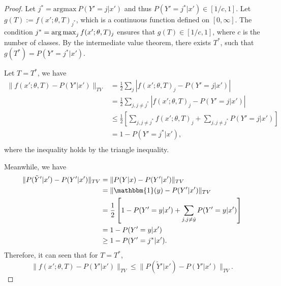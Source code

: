 \begin{proof}


Let $j^* = \text{argmax}~P(Y'=j|x')$ and thus $P(Y'=j^*|x') \in [1/c,1]$. Let $g(T) := f(x'; \theta, T)_{j^*}$, which is a continuous function defined on $[0, \infty]$. The condition $j^* = \operatorname*{arg\,max}_j f(x'; \theta, T)_j$ ensures that $g(T) \in [1/c, 1]$, where $c$ is the number of classes. By the intermediate value theorem, there exists $T^*$, such that $g(T^*) = P(Y'=j^*|x')$.

Let $T = T^*$, we have
$$
\begin{aligned}
\|f(x'; \theta, T) - P(Y' | x')\|_{TV} 
& = \frac{1}{2} \sum_j \left|f(x'; \theta, T)_j - P(Y' =j | x')\right|\\
& = \frac{1}{2} \sum_{j, j\ne j^*} \left|f(x'; \theta, T)_j - P(Y' = j| x')\right|\\
& \le \frac{1}{2} \left[ \sum_{j, j\ne j^*} f(x'; \theta, T)_j + \sum_{j, j\ne j^*} P(Y' = j| x') \right]\\
& = 1 - P(Y'=j^*|x'),\\
\end{aligned}
$$
where the inequality holds by the triangle inequality.


Meanwhile, we have
$$
\begin{aligned}
\|P(\tilde{Y}' | x') - P(Y' | x')\|_{TV} 
& = \|P(Y | x) - P(Y' | x')\|_{TV}\\ 
& = \|\mathbbm{1}(y) - P(Y' | x')\|_{TV} \\
& = \frac{1}{2} \left[1 - P(Y' = y| x') + \sum_{j,j\ne \hat{y}} P(Y' = y| x')\right]\\
& = 1 - P(Y' = y| x')\\
& \ge 1 - P(Y' = j^* | x').\\
\end{aligned}
$$
Therefore, it can seen that for $T=T^*$,
$$
\| f(x'; \theta, T) - P(Y' | x') \|_{TV} \le \|  P(\tilde{Y}' | x') - P(Y' | x')\|_{TV}.
$$
\end{proof}






